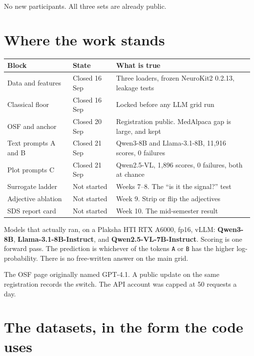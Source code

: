 \documentclass[11pt]{article}
\begin{document}
No new participants. All three sets are already public.

\section{Where the work stands}

\begin{center}
{\small
\begin{tabularx}{\textwidth}{@{}L{4.15cm}L{2.55cm}Y@{}}
\textbf{Block} & \textbf{State} & \textbf{What is true} \\
\midrule
Data and features & Closed 16 Sep & Three loaders, frozen NeuroKit2 0.2.13, leakage tests \\
Classical floor & Closed 16 Sep & Locked before any LLM grid run \\
OSF and anchor & Closed 20 Sep & Registration public. MedAlpaca gap is large, and kept \\
Text prompts A and B & Closed 21 Sep & Qwen3-8B and Llama-3.1-8B, 11{,}916 scores, 0 failures \\
Plot prompts C & Closed 21 Sep & Qwen2.5-VL, 1{,}896 scores, 0 failures, both at chance \\
Surrogate ladder & Not started & Weeks 7--8. The ``is it the signal?'' test \\
Adjective ablation & Not started & Week 9. Strip or flip the adjectives \\
SDS report card & Not started & Week 10. The mid-semester result \\
\bottomrule
\end{tabularx}
}
\end{center}

Models that actually ran, on a Plaksha HTI RTX A6000, fp16, vLLM: \textbf{Qwen3-8B}, \textbf{Llama-3.1-8B-Instruct}, and \textbf{Qwen2.5-VL-7B-Instruct}. Scoring is one forward pass. The prediction is whichever of the tokens \texttt{A} or \texttt{B} has the higher log-probability. There is no free-written answer on the main grid.

The OSF page originally named GPT-4.1. A public update on the same registration records the switch. The API account was capped at 50 requests a day.

\section{The datasets, in the form the code uses}
\end{document}
